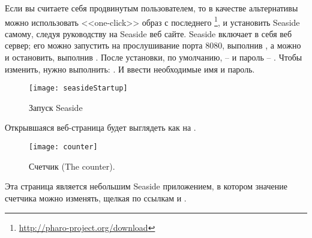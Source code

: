 \documentclass[a4paper,10pt,twoside]{book}
\begin{document}
Если вы считаете себя продвинутым пользователем,
то в качестве альтернативы можно использовать <<one-click>> образ
с последнего
\footnote{\url{http://pharo-project.org/download}},
и установить Seaside самому, следуя руководству
 на Seaside веб сайте.
Seaside включает в себя веб сервер;
его можно запустить на прослушивание порта 8080,
выполнив  ,
а можно и остановить, выполнив .
После установки, по умолчанию,
 --  и пароль -- .
Чтобы изменить, нужно выполнить:  .
И ввести необходимые имя и пароль.


\begin{figure}[tbh]
\begin{center}
\texttt{[image: seasideStartup]}

\caption{Запуск Seaside}

\end{center}
\end{figure}


\noindent
Открывшаяся веб-страница будет выглядеть как на .

\noindent

\begin{figure}[htb]
\begin{center}
\texttt{[image: counter]}
\caption{Счетчик (The counter).}
\end{center}
\end{figure}

\noindent

Эта страница является небольшим Seaside приложением,
в котором значение счетчика можно изменять,
щелкая по ссылкам \link{++} и \link{--}.
\end{document}
